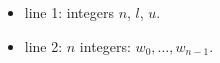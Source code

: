 \begin{itemize}
\item line 1: integers $n$, $l$, $u$. 
\item line 2: $n$ integers: $w_0, \ldots , w_{n - 1}$.
\end{itemize}